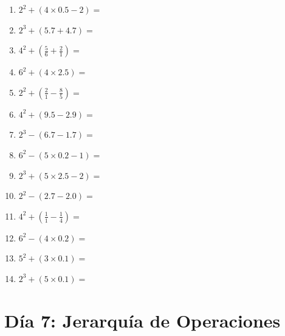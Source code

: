 \documentclass[12pt]{article}
\begin{document}
\begin{enumerate}
\item \large $ 2^{2} + (4 \times 0.5 - 2) = $ \vspace{1.4cm}
\item \large $ 2^{3} + (5.7 + 4.7) = $ \vspace{1.4cm}
\newpage
\item \large $ 4^{2} + (\frac{5}{6} + \frac{2}{1}) = $ \vspace{1.4cm}
\item \large $ 6^{2} + (4 \times 2.5) = $ \vspace{1.4cm}
\item \large $ 2^{2} + (\frac{2}{1} - \frac{8}{5}) = $ \vspace{1.4cm}
\item \large $ 4^{2} + (9.5 - 2.9) = $ \vspace{1.4cm}
\item \large $ 2^{3} - (6.7 - 1.7) = $ \vspace{1.4cm}
\item \large $ 6^{2} - (5 \times 0.2 - 1) = $ \vspace{1.4cm}
\item \large $ 2^{3} + (5 \times 2.5 - 2) = $ \vspace{1.4cm}
\item \large $ 2^{2} - (2.7 - 2.0) = $ \vspace{1.4cm}
\item \large $ 4^{2} + (\frac{1}{1} - \frac{1}{4}) = $ \vspace{1.4cm}
\item \large $ 6^{2} - (4 \times 0.2) = $ \vspace{1.4cm}
\newpage
\item \large $ 5^{2} + (3 \times 0.1) = $ \vspace{1.4cm}
\item \large $ 2^{3} + (5 \times 0.1) = $ \vspace{1.4cm}
\end{enumerate}
\newpage
\section*{Día 7: Jerarquía de Operaciones}
\end{document}
